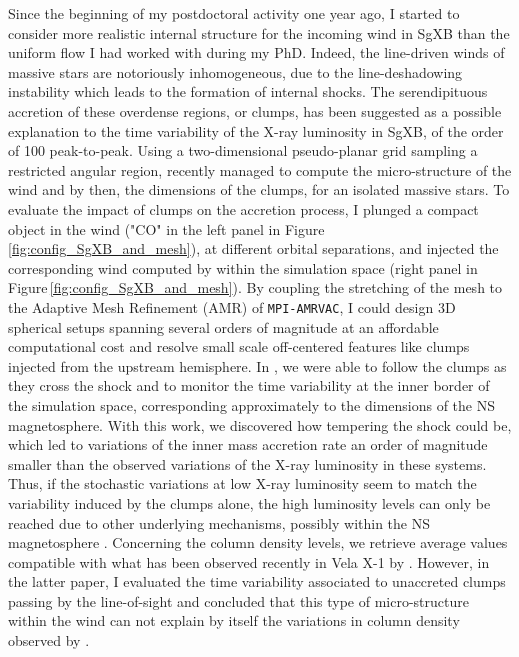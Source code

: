 \documentclass[a4paper,12pt,onecolumn]{article}
\begin{document}
\indent Since the beginning of my postdoctoral activity one year ago, I started to consider more realistic internal structure for the incoming wind in SgXB than the uniform flow I had worked with during my PhD. Indeed, the line-driven winds of massive stars are notoriously inhomogeneous, due to the line-deshadowing instability \citep{Owocki1984a} which leads to the formation of internal shocks. The serendipituous accretion of these overdense regions, or clumps, has been suggested as a possible explanation to the time variability of the X-ray luminosity in SgXB, of the order of 100 peak-to-peak. Using a two-dimensional pseudo-planar grid sampling a restricted angular region, \cite{Sundqvist2017} recently managed to compute the micro-structure of the wind and by then, the dimensions of the clumps, for an isolated massive stars. To evaluate the impact of clumps on the accretion process, I plunged a compact object in the wind ("CO" in the left panel in Figure\,\ref{fig:config_SgXB_and_mesh}), at different orbital separations, and injected the corresponding wind computed by \cite{Sundqvist2017} within the simulation space (right panel in Figure\,\ref{fig:config_SgXB_and_mesh}). By coupling the stretching of the mesh to the Adaptive Mesh Refinement (AMR) of \texttt{MPI-AMRVAC}, I could design 3D spherical setups spanning several orders of magnitude at an affordable computational cost and resolve small scale off-centered features like clumps injected from the upstream hemisphere. In \cite{ElMellah}, we were able to follow the clumps as they cross the shock and to monitor the time variability at the inner border of the simulation space, corresponding approximately to the dimensions of the NS magnetosphere. With this work, we discovered how tempering the shock could be, which led to variations of the inner mass accretion rate an order of magnitude smaller than the observed variations of the X-ray luminosity in these systems. Thus, if the stochastic variations at low X-ray luminosity seem to match the variability induced by the clumps alone, the high luminosity levels can only be reached due to other underlying mechanisms, possibly within the NS magnetosphere \citep[eg the propeller effect,][]{Bozzo2016}. Concerning the column density levels, we retrieve average values compatible with what has been observed recently in Vela X-1 by \cite{Grinberg2017}. However, in the latter paper, I evaluated the time variability associated to unaccreted clumps passing by the line-of-sight and concluded that this type of micro-structure within the wind can not explain by itself the variations in column density observed by \cite{Grinberg2017}.\\ \\
\end{document}
